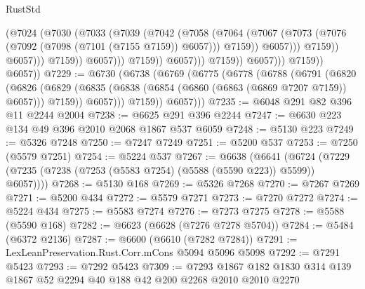 \begin{lexlean}{RustStd}
\begin{coremodule}
                                            (@7024
                                              (@7030
                                                (@7033
                                                  (@7039
                                                    (@7042
                                                      (@7058
                                                        (@7064
                                                          (@7067
                                                            (@7073
                                                              (@7076
                                                                (@7092
                                                                  (@7098
                                                                    (@7101 (@7155 @7159))
                                                                    @6057)))
                                                              @7159))
                                                          @6057)))
                                                    @7159))
                                                @6057)))
                                          @7159))
                                      @6057)))
                                @7159))
                            @6057)))
                      @7159))
                  @6057)))
            @7159))
        @6057))
@7229 := @6730
    (@6738
      (@6769
        (@6775
          (@6778
            (@6788
              (@6791
                (@6820
                  (@6826
                    (@6829 (@6835 (@6838 (@6854 (@6860 (@6863 (@6869 @7207 @7159)) @6057))) @7159))
                    @6057)))
              @7159))
          @6057)))
@7235 := @6048 @291 @82 @396 @11 @2244 @2004
@7238 := @6625 @291 @396 @2244
@7247 := @6630 @223 @134 @49 @396 @2010 @2068 @1867 @537 @6059
@7248 := @5130 @223
@7249 := @5326 @7248
@7250 := @7247 @7249
@7251 := @5200 @537
@7253 := @7250 (@5579 @7251)
@7254 := @5224 @537
@7267 := @6638
    (@6641 (@6724 (@7229 (@7235 (@7238 (@7253 (@5583 @7254) (@5588 (@5590 @223)) @5599)) @6057))))
@7268 := @5130 @168
@7269 := @5326 @7268
@7270 := @7267 @7269
@7271 := @5200 @434
@7272 := @5579 @7271
@7273 := @7270 @7272
@7274 := @5224 @434
@7275 := @5583 @7274
@7276 := @7273 @7275
@7278 := @5588 (@5590 @168)
@7282 := @6623 (@6628 (@7276 @7278 @5704))
@7284 := @5484 (@6372 @2136)
@7287 := @6600 (@6610 (@7282 @7284))
@7291 := LexLeanPreservation.Rust.Corr.mCons @5094 @5096 @5098
@7292 := @7291 @5423
@7293 := @7292 @5423
@7309 := @7293 @1867 @182 @1830 @314 @139 @1867 @52 @2294 @40 @188 @42 @200 @2268 @2010 @2010 @2270

\end{coremodule}
\end{lexlean}
